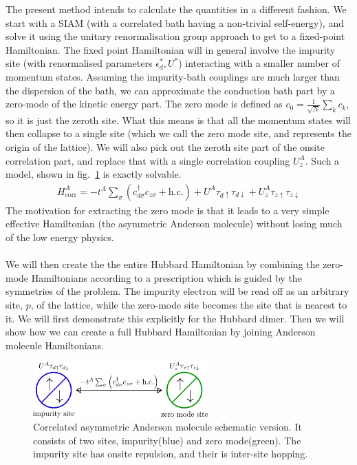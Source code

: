 \documentclass[12pt]{article}
\numberwithin{equation}{section}
\begin{document}
The present method intends to calculate the quantities in a different fashion.
We start with a SIAM (with a correlated bath having a non-trivial self-energy), and solve it using the unitary renormalisation group approach to get to a fixed-point Hamiltonian.
The fixed point Hamiltonian will in general involve the impurity site (with renormalised parameters $\epsilon_d^*, U^*$) interacting with a smaller number of momentum states.
Assuming the impurity-bath couplings are much larger than the dispersion of the bath, we can approximate the conduction bath part by a zero-mode of the kinetic energy part. The zero mode is defined as $c_0 = \frac{1}{\sqrt N}\sum_k c_k$, so it is just the zeroth site. 
What this means is that all the momentum states will then collapse to a single site (which we call the zero mode site, and represents the origin of the lattice). We will also pick out the zeroth site part of the onsite correlation part, and replace that with a single correlation coupling $U^A_z$.
Such a model, shown in fig.~\ref{and_mol} is exactly solvable.
\begin{equation}\begin{aligned}
	H^A_\text{corr} = -t^A\sum_{\sigma}\left(c^\dagger_{d\sigma}c_{z\sigma} + \text{h.c.}\right) + U^A\tau_{d \uparrow}\tau_{d \downarrow} + U^A_z\tau_{z \uparrow}\tau_{z \downarrow}
\end{aligned}\end{equation}
The motivation for extracting the zero mode is that it leads to a very simple effective Hamiltonian (the asymmetric Anderson molecule) without losing much of the low energy physics.
\\\\
We will then create the the entire Hubbard Hamiltonian by combining the zero-mode Hamiltonians according to a prescription which is guided by the symmetries of the problem.
The impurity electron will be read off as an arbitrary site, \(p\), of the lattice, while the zero-mode site becomes the site that is nearest to it.
We will first demonstrate this explicitly for the Hubbard dimer.
Then we will show how we can create a full Hubbard Hamiltonian by joining Anderson molecule Hamiltonians.
\begin{figure}[htpb]
	\centering
	\includegraphics[width=0.6\textwidth]{./gen_siam.png}
	\caption{Correlated asymmetric Anderson molecule schematic version. It consists of two sites, impurity(blue) and zero mode(green). The impurity site has onsite repulsion, and their is inter-site hopping.}
	\label{and_mol}
\end{figure}
\end{document}

